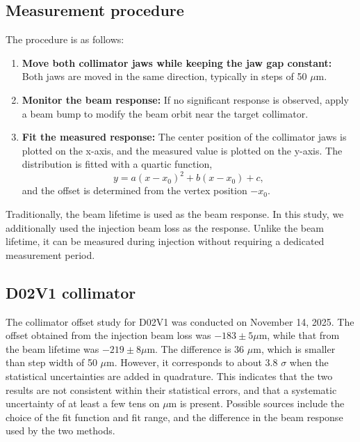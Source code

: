 \subsection{Measurement procedure}
The procedure is as follows:

\begin{enumerate}
    \item \textbf{Move both collimator jaws while keeping the jaw gap constant:}
    Both jaws are moved in the same direction, typically in steps of 50 $\mu \mathrm{m} $. 

    \item \textbf{Monitor the beam response:}
    If no significant response is observed, apply a beam bump to modify the beam orbit near the target collimator.
    
    \item \textbf{Fit the measured response:}
    The center position of the collimator jaws is plotted on the x-axis, and the measured value is plotted on the y-axis. The distribution is fitted with a quartic function, 
    \begin{equation}
        y = a(x - x_0)^2 + b (x - x_0) + c, 
    \end{equation}
    and the offset is determined from the vertex position $-x_0$.

\end{enumerate}

Traditionally, the beam lifetime is used as the beam response. In this study, we additionally used the injection beam loss as the response. Unlike the beam lifetime, it can be measured during injection without requiring a dedicated measurement period. 

\subsection{D02V1 collimator}
The collimator offset study for D02V1 was conducted on November 14, 2025. The offset obtained from the injection beam loss was $-183 \pm 5 \mu \mathrm{m}$, while that from the beam lifetime was $-219 \pm 8 \mu\mathrm{m}$. The difference is 36 $\mu \mathrm{m} $, which is smaller than step width of 50 $\mu \mathrm{m} $. However, it corresponds to about 3.8 $\sigma$ when the statistical uncertainties are added in quadrature. This indicates that the two results are not consistent within their statistical errors, and that a systematic uncertainty of at least a few tens on $\mu \mathrm{m} $ is present. Possible sources include the choice of the fit function and fit range, and the difference in the beam response used by the two methods. 

